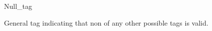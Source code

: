 \begin{ccRefClass}{Null_tag}
\label{Null_tag}

\ccDefinition
General tag indicating that non of any other possible tags is valid.  

\ccIsModel
{}

\ccSeeAlso
{}\\
\end{ccRefClass} 